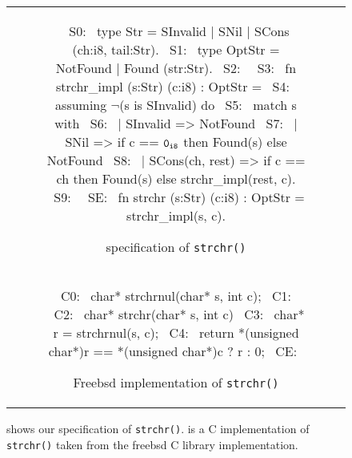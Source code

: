 \begin{figure}[t!]
\begin{tabular}{@{}c@{}}
\begin{subfigure}[b]{\textwidth}
\begin{center}
\begin{allLangEnvFoot}
~{\tiny \textcolor{mygray}{S0:}}~ type Str = SInvalid | SNil | SCons (ch:i8, tail:Str).
~{\tiny \textcolor{mygray}{S1:}}~ type OptStr = NotFound | Found (str:Str).
~{\tiny \textcolor{mygray}{S2:}}~ 
~{\tiny \textcolor{mygray}{S3:}}~ fn strchr_impl (s:Str) (c:i8) : OptStr =
~{\tiny \textcolor{mygray}{S4:}}~   assuming $\neg$(s is SInvalid) do
~{\tiny \textcolor{mygray}{S5:}}~   match s with
~{\tiny \textcolor{mygray}{S6:}}~   | SInvalid => NotFound
~{\tiny \textcolor{mygray}{S7:}}~   | SNil => if c == ${\tt 0_{i8}}$ then Found(s) else NotFound
~{\tiny \textcolor{mygray}{S8:}}~   | SCons(ch, rest) => if c == ch then Found(s) else strchr_impl(rest, c).
~{\tiny \textcolor{mygray}{S9:}}~ 
~{\tiny \textcolor{mygray}{SE:}}~ fn strchr (s:Str) (c:i8) : OptStr = strchr_impl(s, c).
\end{allLangEnvFoot}
\end{center}
\caption{\label{fig:limitationExStrchrSpec}\SpecL{} specification of {\tt strchr()}}
\end{subfigure}%
\\
\begin{subfigure}[b]{\textwidth}
\begin{center}
\begin{allLangEnvFoot}
~{\tiny \textcolor{mygray}{C0:}}~ char* strchrnul(char* s, int c);
~{\tiny \textcolor{mygray}{C1:}}~ 
~{\tiny \textcolor{mygray}{C2:}}~ char* strchr(char* s, int c) {
~{\tiny \textcolor{mygray}{C3:}}~   char* r = strchrnul(s, c);
~{\tiny \textcolor{mygray}{C4:}}~   return *(unsigned char*)r == *(unsigned char*)c ? r : 0;
~{\tiny \textcolor{mygray}{CE:}}~ }
\end{allLangEnvFoot}
\end{center}
\caption{\label{fig:limitationExStrchrImpl}Freebsd implementation of {\tt strchr()}}
\end{subfigure}%
\\
\end{tabular}
\caption{\label{fig:limitationExStrchr} shows our \SpecL{} specification of {\tt strchr()}.
 is a C implementation of {\tt strchr()} taken from the freebsd C library implementation.}
\end{figure}